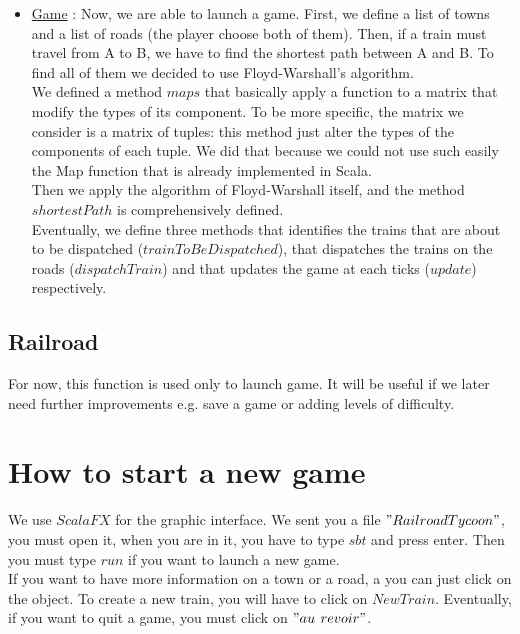 \documentclass[a4paper]{article}
\begin{document}
\begin{itemize}
		\item \underline{Game} : Now, we are able to launch a game. First, we define a list of towns and a list of roads (the player choose both of them). Then, if a train must travel from A to B, we have to find the shortest path between A and B. To find all of them we decided to use Floyd-Warshall's algorithm. \\
		We defined a method $maps$ that basically apply a function to a matrix that modify the types of its component. To be more specific, the matrix we consider is a matrix of tuples: this method just alter the types of the components of each tuple. We did that because we could not use such easily the Map function that is already implemented in Scala. \\
		Then we apply the algorithm of Floyd-Warshall itself, and the method $shortestPath$ is comprehensively defined.\\
		Eventually, we define three methods that identifies the trains that are about to be dispatched ($trainToBeDispatched$), that dispatches the trains on the roads ($dispatchTrain$) and that updates the game at each ticks ($update$) respectively. 
		
		
		
		
	\end{itemize}
	\subsection{Railroad}
	For now, this function is used only to launch game. It will be useful if we later need further improvements e.g. save a game or adding levels of difficulty.
	\section{How to start a new game}
	
	We use $ScalaFX$ for the graphic interface. We sent you a file $"RailroadTycoon"$, you must open it, when you are in it, you have to type $sbt$ and press enter. Then you must type $run$ if you want to launch a new game.\\
	If you want to have more information on a town or a road, a you can just click on the object.
	To create a new train, you will have to click on $New Train$. Eventually, if you want to quit a game, you must click on $"au$ $revoir"$.
		
\end{document}
